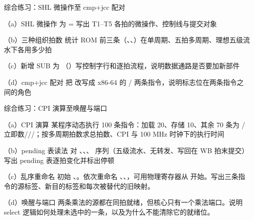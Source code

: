 \begin{chapterexercise}{综合练习：SHL 微操作至 cmp+jcc 配对}
\begin{exercisesubproblem}{（a）SHL 微操作}
为 = 写出 T1--T5 各拍的微操作、控制线与提交对象
\end{exercisesubproblem}
\begin{exercisesubproblem}{（b）三种组织拍数}
统计 ROM 前三条（、、）在单周期、五拍多周期、理想五级流水下各用多少拍
\end{exercisesubproblem}
\begin{exercisesubproblem}{（c）新增 SUB}
为 （）写控制字行和逐拍流程，说明数据通路是否要加新部件
\end{exercisesubproblem}
\begin{exercisesubproblem}{（d）cmp+jcc 配对}
把  改写成 x86-64 的 / 两条指令，说明标志位在两条指令之间的角色
\end{exercisesubproblem}
\end{chapterexercise}

\begin{chapterexercise}{综合练习：CPI 演算至唤醒与端口}
\begin{exercisesubproblem}{（a）CPI 演算}
某程序动态执行 100 条指令：加载 20、存储 10、其余 70 条为 / 立即数///；按多周期拍数求总拍数、CPI 与 100 MHz 时钟下的执行时间
\end{exercisesubproblem}
\begin{exercisesubproblem}{（b）pending 表读法}
对 、、、 序列（五级流水、无转发、写回在 WB 拍末提交）写出 pending 表逐拍变化并标出停顿
\end{exercisesubproblem}
\begin{exercisesubproblem}{（c）乱序重命名}
初始 、。依次重命名 、、，可用物理寄存器从  开始。写出三条指令的源标签、新目的标签和每次被替代的旧映射。
\end{exercisesubproblem}
\begin{exercisesubproblem}{（d）唤醒与端口}
两条乘法的源都在同拍就绪，但核心只有一个乘法端口。说明 select 逻辑如何处理未选中的一条，以及为什么不能清除它的就绪位。
\end{exercisesubproblem}
\end{chapterexercise}


